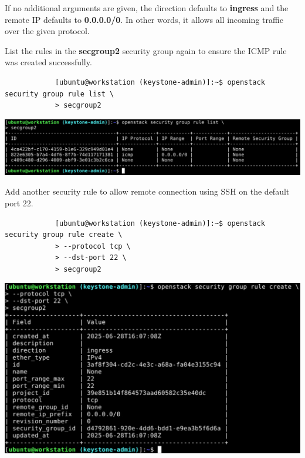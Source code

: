 \documentclass[letterpaper, 12pt]{article}
\begin{document}
\begin{enumerate}
    \begin{notebox}
        If no additional arguments are given, the direction defaults to \textbf{ingress} and the remote IP defaults to \textbf{0.0.0.0/0}.
        In other words, it allows all incoming traffic over the given protocol.
    \end{notebox}

    \begin{labstep}
        List the rules in the \textbf{secgroup2} security group again to ensure the ICMP rule was created successfully.
        \begin{lstlisting}
            [ubuntu@workstation (keystone-admin)]:~$ openstack security group rule list \
            > secgroup2
        \end{lstlisting}

        \begin{center}
            \includegraphics[width=\linewidth]{images/part5/step18.png}
        \end{center}
    \end{labstep}

    \begin{labstep}
        Add another security rule to allow remote connection using SSH on the default port 22.
        \begin{lstlisting}
            [ubuntu@workstation (keystone-admin)]:~$ openstack security group rule create \
            > --protocol tcp \
            > --dst-port 22 \
            > secgroup2
        \end{lstlisting}

        \begin{center}
            \includegraphics[width=\linewidth]{images/part5/step19.png}
        \end{center}
    \end{labstep}


\end{enumerate}
\end{document}
